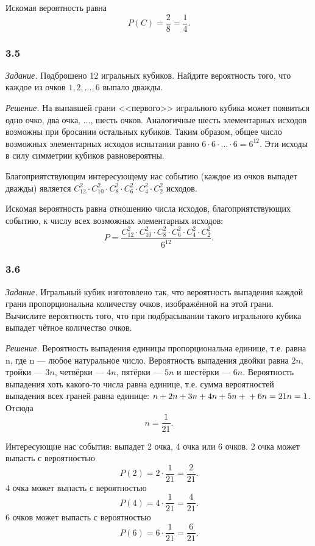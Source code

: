 \documentclass{book}
\begin{document}
Искомая вероятность равна
$$P \left( C \right) =
\frac{2}{8} =
\frac{1}{4}.$$

\subsubsection*{3.5}

\textit{Задание.} Подброшено 12 игральных кубиков.
Найдите вероятность того, что каждое из очков $1, 2, \dotsc, 6$ выпало дважды.

\textit{Решение.}
На выпавшей грани <<первого>> игрального кубика может появиться одно очко, два очка, $ \dotsc $, шесть очков.
Аналогичные шесть элементарных исходов возможны при бросании остальных кубиков.
Таким образом, общее число возможных элементарных исходов испытания равно $6 \cdot 6 \cdot \dotsc \cdot 6 = 6^{12}$.
Эти исходы в силу симметрии кубиков равновероятны.

Благоприятствующим интересующему нас событию
(каждое из очков выпадет дважды)
является $C_{12}^2 \cdot C_{10}^2 \cdot C_8^2 \cdot C_6^2 \cdot C_4^2 \cdot C_2^2$ исходов.

Искомая вероятность равна отношению числа исходов, благоприятствующих событию,
к числу всех возможных элементарных исходов:
$$P =
\frac{C_{12}^2 \cdot C_{10}^2 \cdot C_8^2 \cdot C_6^2 \cdot C_4^2 \cdot C_2^2}{6^{12}}.$$

\subsubsection*{3.6}

\textit{Задание.}
Игральный кубик изготовлено так,
что вероятность выпадения каждой грани пропорциональна количеству очков, изображённой на этой грани.
Вычислите вероятность того, что при подбрасывании такого игрального кубика выпадет чётное количество очков.

\textit{Решение.} Вероятность выпадения единицы пропорциональна единице, т.е. равна n, где n --- любое натуральное число.
Вероятность выпадения двойки равна $2 n$, тройки --- $3 n$, четвёрки --- $4 n$, пятёрки --- $5 n$ и шестёрки --- $6 n$.
Вероятность выпадения хоть какого-то числа равна единице, т.е. сумма вероятностей выпадения всех граней равна единице: $n + 2 n + 3 n + 4 n + 5 n + \\ + 6 n = 21 n = 1$.
Отсюда
$$n =
\frac{1}{21}.$$

Интересующие нас события: выпадет 2 очка, 4 очка или 6 очков.
2 очка может выпасть с вероятностью
$$ P \left( 2 \right) =
2 \cdot \frac{1}{21} =
\frac{2}{21}.$$
4 очка может выпасть с вероятностью
$$ P \left( 4 \right) =
4 \cdot \frac{1}{21} =
\frac{4}{21}.$$
6 очков может выпасть с вероятностью
$$ P \left( 6 \right) =
6 \cdot \frac{1}{21} =
\frac{6}{21}.$$
\end{document}
